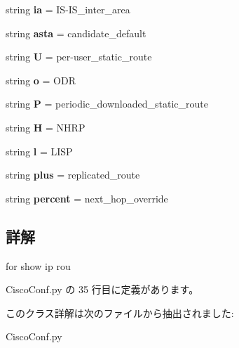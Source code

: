 \begin{DoxyCompactItemize}
\item 
\mbox{\label{classCiscoConf_1_1eIprouCode_a4f0b422dff6ead08d9167cd909191ec0}} 
string {\bfseries ia} = \textquotesingle{}IS-\/I\+S\+\_\+inter\+\_\+area\textquotesingle{}
\item 
\mbox{\label{classCiscoConf_1_1eIprouCode_a7d5e3abf9cee4a175b759f12f81ab583}} 
string {\bfseries asta} = \textquotesingle{}candidate\+\_\+default\textquotesingle{}
\item 
\mbox{\label{classCiscoConf_1_1eIprouCode_a25a7b9158a06068d85d809bd6137e49b}} 
string {\bfseries U} = \textquotesingle{}per-\/user\+\_\+static\+\_\+route\textquotesingle{}
\item 
\mbox{\label{classCiscoConf_1_1eIprouCode_a374c0823bcdb16f3f162e64e93c9890c}} 
string {\bfseries o} = \textquotesingle{}O\+DR\textquotesingle{}
\item 
\mbox{\label{classCiscoConf_1_1eIprouCode_aba69d85a2aa5186f8f7c4b7931b20e9f}} 
string {\bfseries P} = \textquotesingle{}periodic\+\_\+downloaded\+\_\+static\+\_\+route\textquotesingle{}
\item 
\mbox{\label{classCiscoConf_1_1eIprouCode_a91901a3529304cf92215bbb7f477994b}} 
string {\bfseries H} = \textquotesingle{}N\+H\+RP\textquotesingle{}
\item 
\mbox{\label{classCiscoConf_1_1eIprouCode_a1beefe4aacb0c178e7ebc79fa5b54f60}} 
string {\bfseries l} = \textquotesingle{}L\+I\+SP\textquotesingle{}
\item 
\mbox{\label{classCiscoConf_1_1eIprouCode_ad2484c0d53453fa17c27dfbb528dbc0a}} 
string {\bfseries plus} = \textquotesingle{}replicated\+\_\+route\textquotesingle{}
\item 
\mbox{\label{classCiscoConf_1_1eIprouCode_a12f124e5da2c2e8a621976732c372ca4}} 
string {\bfseries percent} = \textquotesingle{}next\+\_\+hop\+\_\+override\textquotesingle{}
\end{DoxyCompactItemize}


\subsection{詳解}
\begin{DoxyVerb}for show ip rou
\end{DoxyVerb}
 

 Cisco\+Conf.\+py の 35 行目に定義があります。



このクラス詳解は次のファイルから抽出されました\+:\begin{DoxyCompactItemize}
\item 
Cisco\+Conf.\+py\end{DoxyCompactItemize}

